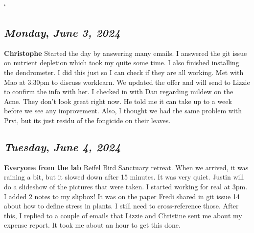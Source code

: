 `\begin{center}
\section*{\month}
\end{center}

\def\day{\textit{June 3, 2024}}
\def\weekday{\textit{Monday}}
\subsection*{\weekday, \day}
\textbf{Christophe}
Started the day by answering many emails. I answered the git issue on nutrient depletion which took my quite some time. I also finished installing the dendrometer. I did this just so I can check if they are all working.
Met with Mao at 3:30pm to discuss worklearn. We updated the offer and will send to Lizzie to confirm the info with her. 
I checked in with Dan regarding mildew on the Acne. They don't look great right now. He told me it can take up to a week before we see any improvement. Also, I thought we had the same problem with Prvi, but its just residu of the fongicide on their leaves. 

\def\day{\textit{June 4, 2024}}
\def\weekday{\textit{Tuesday}}
\subsection*{\weekday, \day}
\textbf {Everyone from the lab}
Reifel Bird Sanctuary retreat. When we arrived, it was raining a bit, but it slowed down after 15 minutes. It was very quiet. Justin will do a slideshow of the pictures that were taken. I started working for real at 3pm. I added 2 notes to my slipbox! It was on the paper Fredi shared in git issue 14 about how to define stress in plants. I still need to cross-reference those. After this, I replied to a couple of emails that Lizzie and Christine sent me about my expense report. It took me about an hour to get this done. 

\def\day{\textit{June 5, 2024}}
\def\weekday{\textit{Wednesday}}
